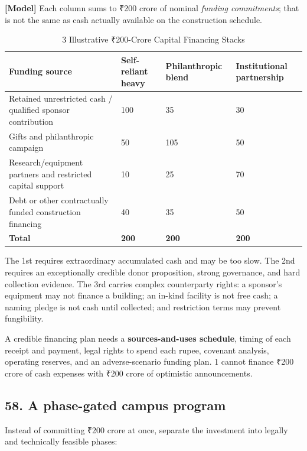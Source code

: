 \textbf{\textbf{[Model]}} Each column sums to \textnormal{₹}200 crore of nominal \textit{funding commitments}; that is not the same as cash actually available on the construction schedule.

\begin{table}[t]
\centering
\small
\caption{3 Illustrative \textnormal{₹}200-Crore Capital Financing Stacks}
\label{tab:ch36_capital_stacks}
\begin{tabularx}{\textwidth}{p{4.5cm} p{2.8cm} p{2.8cm} X}
\toprule
\textbf{ Funding source } & \textbf{ Self-reliant heavy } & \textbf{ Philanthropic blend } & \textbf{ Institutional partnership } \\
\midrule
 Retained unrestricted cash / qualified sponsor contribution  &  100  &  35  &  30  \\
 Gifts and philanthropic campaign  &  50  &  105  &  50  \\
 Research/\allowbreak equipment partners and restricted capital support  &  10  &  25  &  70  \\
 Debt or other contractually funded construction financing  &  40  &  35  &  50  \\
 \textbf{Total}  &  \textbf{200}  &  \textbf{200}  &  \textbf{200}  \\
\bottomrule
\end{tabularx}
\end{table}

The 1st requires extraordinary accumulated cash and may be too slow. The 2nd requires an exceptionally credible donor proposition, strong governance, and hard collection evidence. The 3rd carries complex counterparty rights: a sponsor's equipment may not finance a building; an in-kind facility is not free cash; a naming pledge is not cash until collected; and restriction terms may prevent fungibility.

A credible financing plan needs a \textbf{sources-and-uses schedule}, timing of each receipt and payment, legal rights to spend each rupee, covenant analysis, operating reserves, and an adverse-scenario funding plan. 1 cannot finance \textnormal{₹}200 crore of cash expenses with \textnormal{₹}200 crore of optimistic announcements.

\subsection{58. A phase-gated campus program}

Instead of committing \textnormal{₹}200 crore at once, separate the investment into legally and technically feasible phases:

